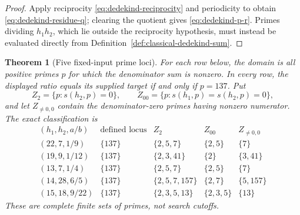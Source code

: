 \documentclass[11pt]{article}
\newtheorem{theorem}{Theorem}[section]
\theoremstyle{definition}
\theoremstyle{remark}
\begin{document}
\begin{proof}
Apply reciprocity \eqref{eq:dedekind-reciprocity} and periodicity to obtain
\eqref{eq:dedekind-residue-q}; clearing the quotient gives
\eqref{eq:dedekind-p-r}.  Primes dividing $h_1h_2$, which lie outside the
reciprocity hypothesis, must instead be evaluated directly from
Definition~\ref{def:classical-dedekind-sum}.
\end{proof}

\begin{theorem}[Five fixed-input prime loci]
\label{thm:dedekind-fixed-pair-prime-loci}
For each row below, the domain is all positive primes $p$ for which the
denominator sum is nonzero.  In every row, the displayed ratio equals its
supplied target if and only if $p=137$.
Put
\[
  Z_2=\{p:s(h_2,p)=0\},\qquad
  Z_{00}=\{p:s(h_1,p)=s(h_2,p)=0\},
\]
and let $Z_{\ne0,0}$ contain the denominator-zero primes having nonzero
  numerator.  The exact classification is
\[
\begin{array}{c|c|c|c|c}
(h_1,h_2,a/b)&\text{defined locus}&Z_2&Z_{00}&Z_{\ne0,0}\\
\hline
(22,7,1/9)  &\{137\}&\{2,5,7\}     &\{2,5\}   &\{7\}\\
(19,9,1/12) &\{137\}&\{2,3,41\}    &\{2\}     &\{3,41\}\\
(13,7,1/4)  &\{137\}&\{2,5,7\}     &\{2,5\}   &\{7\}\\
(14,28,6/5) &\{137\}&\{2,5,7,157\} &\{2,7\}   &\{5,157\}\\
(15,18,9/22)&\{137\}&\{2,3,5,13\}  &\{2,3,5\} &\{13\}
\end{array}
\]
These are complete finite sets of primes, not search cutoffs.
\end{theorem}
\end{document}
